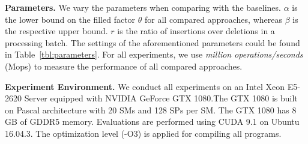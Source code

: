 \vspace{1mm}\noindent\textbf{Parameters.}
We vary the parameters when comparing \voter with the baselines.
$\alpha$ is the lower bound on the filled factor $\theta$ for all compared approaches,
whereas $\beta$ is the respective upper bound.
$r$ is the ratio of insertions over deletions in a processing batch. 
The settings of the aforementioned parameters could be found in Table~\ref{tbl:parameters}. For all experiments, we use \emph{million operations/seconds} (Mops) to measure the performance of all compared approaches.

\vspace{1mm}\noindent\textbf{Experiment Environment.}
We conduct all experiments on an Intel Xeon E5-2620 Server equipped with NVIDIA GeForce GTX 1080.The GTX 1080 is built on Pascal architecture with 20 SMs and 128 SPs per SM. The GTX 1080 has 8 GB of GDDR5 memory. Evaluations are performed using CUDA 9.1 on Ubuntu 16.04.3. The optimization level (-O3) is applied for compiling all programs.



